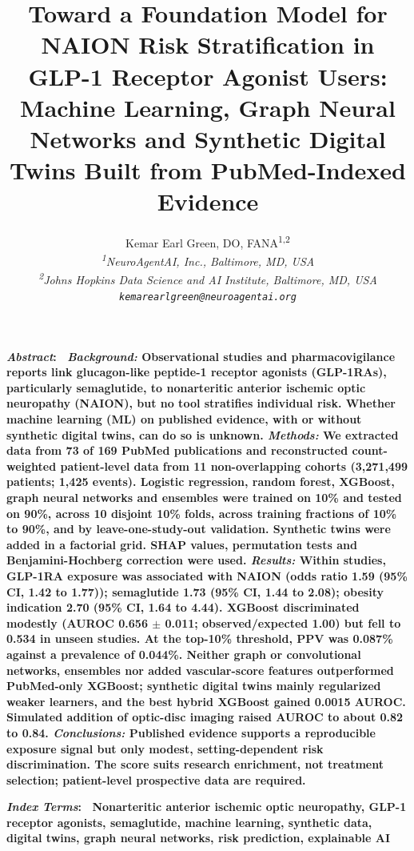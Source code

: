 \documentclass[journal]{IEEEtran}
\renewenvironment{abstract}{\normalfont\bfseries\footnotesize\noindent\textit{Abstract}:\ \ignorespaces}{\par\vspace{0.6\baselineskip}}
\renewenvironment{IEEEkeywords}{\normalfont\bfseries\footnotesize\noindent\textit{Index Terms}:\ \ignorespaces}{\par\vspace{0.6\baselineskip}}
\begin{document}
\title{Toward a Foundation Model for NAION Risk Stratification in GLP-1 Receptor Agonist Users: Machine Learning, Graph Neural Networks and Synthetic Digital Twins Built from PubMed-Indexed Evidence}
\author{Kemar Earl Green, DO, FANA\textsuperscript{1,2}\\[4pt] {\normalsize\itshape \textsuperscript{1}NeuroAgentAI, Inc., Baltimore, MD, USA\\ \textsuperscript{2}Johns Hopkins Data Science and AI Institute, Baltimore, MD, USA\\[2pt] \upshape\texttt{kemarearlgreen@neuroagentai.org}}}
\maketitle
\begin{abstract}
\emph{Background:} Observational studies and pharmacovigilance reports
link glucagon-like peptide-1 receptor agonists (GLP-1RAs), particularly
semaglutide, to nonarteritic anterior ischemic optic neuropathy (NAION),
but no tool stratifies individual risk. Whether machine learning (ML) on
published evidence, with or without synthetic digital twins, can do so
is unknown. \emph{Methods:} We extracted data from 73 of 169 PubMed
publications and reconstructed count-weighted patient-level data from 11
non-overlapping cohorts (3,271,499 patients; 1,425 events). Logistic
regression, random forest, XGBoost, graph neural networks and ensembles
were trained on 10\% and tested on 90\%, across 10 disjoint 10\% folds,
across training fractions of 10\% to 90\%, and by leave-one-study-out
validation. Synthetic twins were added in a factorial grid. SHAP values,
permutation tests and Benjamini-Hochberg correction were used.
\emph{Results:} Within studies, GLP-1RA exposure was associated with
NAION (odds ratio 1.59 (95\% CI, 1.42 to 1.77)); semaglutide 1.73 (95\%
CI, 1.44 to 2.08); obesity indication 2.70 (95\% CI, 1.64 to 4.44).
XGBoost discriminated modestly (AUROC 0.656 \ensuremath{\pm} 0.011; observed/expected
1.00) but fell to 0.534 in unseen studies. At the top-10\% threshold,
PPV was 0.087\% against a prevalence of 0.044\%. Neither graph or
convolutional networks, ensembles nor added vascular-score features
outperformed PubMed-only XGBoost; synthetic digital twins mainly
regularized weaker learners, and the best hybrid XGBoost gained 0.0015
AUROC. Simulated addition of optic-disc imaging raised AUROC to about
0.82 to 0.84. \emph{Conclusions:} Published evidence supports a
reproducible exposure signal but only modest, setting-dependent risk
discrimination. The score suits research enrichment, not treatment
selection; patient-level prospective data are required.
\end{abstract}
\begin{IEEEkeywords}
Nonarteritic anterior ischemic optic neuropathy, GLP-1 receptor agonists, semaglutide, machine learning, synthetic data, digital twins, graph neural networks, risk prediction, explainable AI
\end{IEEEkeywords}
\end{document}
